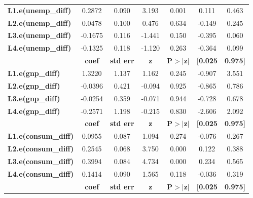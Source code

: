 \documentclass{report}
\begin{document}
\begin{center}
\begin{tabular}{lcccccc}
\midrule
\textbf{L1.e(unemp\_diff)} &       0.2872  &        0.090     &     3.193  &         0.001        &        0.111    &        0.463     \\
\textbf{L2.e(unemp\_diff)} &       0.0478  &        0.100     &     0.476  &         0.634        &       -0.149    &        0.245     \\
\textbf{L3.e(unemp\_diff)} &      -0.1675  &        0.116     &    -1.441  &         0.150        &       -0.395    &        0.060     \\
\textbf{L4.e(unemp\_diff)} &      -0.1325  &        0.118     &    -1.120  &         0.263        &       -0.364    &        0.099     \\
                         & \textbf{coef} & \textbf{std err} & \textbf{z} & \textbf{P$>$$|$z$|$} & \textbf{[0.025} & \textbf{0.975]}  \\
\midrule
\textbf{L1.e(gnp\_diff)} &       1.3220  &        1.137     &     1.162  &         0.245        &       -0.907    &        3.551     \\
\textbf{L2.e(gnp\_diff)} &      -0.0396  &        0.421     &    -0.094  &         0.925        &       -0.865    &        0.786     \\
\textbf{L3.e(gnp\_diff)} &      -0.0254  &        0.359     &    -0.071  &         0.944        &       -0.728    &        0.678     \\
\textbf{L4.e(gnp\_diff)} &      -0.2571  &        1.198     &    -0.215  &         0.830        &       -2.606    &        2.092     \\
                            & \textbf{coef} & \textbf{std err} & \textbf{z} & \textbf{P$>$$|$z$|$} & \textbf{[0.025} & \textbf{0.975]}  \\
\midrule
\textbf{L1.e(consum\_diff)} &       0.0955  &        0.087     &     1.094  &         0.274        &       -0.076    &        0.267     \\
\textbf{L2.e(consum\_diff)} &       0.2545  &        0.068     &     3.750  &         0.000        &        0.122    &        0.388     \\
\textbf{L3.e(consum\_diff)} &       0.3994  &        0.084     &     4.734  &         0.000        &        0.234    &        0.565     \\
\textbf{L4.e(consum\_diff)} &       0.1414  &        0.090     &     1.565  &         0.118        &       -0.036    &        0.319     \\
                            & \textbf{coef} & \textbf{std err} & \textbf{z} & \textbf{P$>$$|$z$|$} & \textbf{[0.025} & \textbf{0.975]}  \\

\end{tabular}
\end{center}
\end{document}
